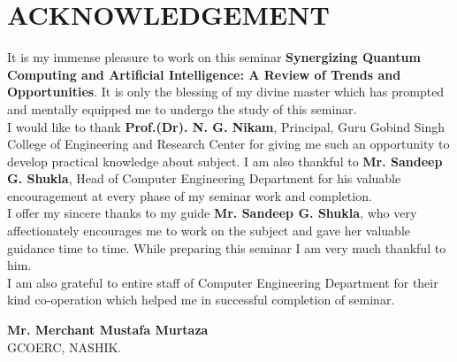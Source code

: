 
\chapter*{ACKNOWLEDGEMENT}
\hspace*{0.3in}It is my immense pleasure to work on this seminar {\bf Synergizing Quantum Computing and Artificial Intelligence: A Review of Trends and Opportunities}. It is only the blessing of my divine master which has prompted and mentally equipped me to undergo the study of this seminar. \\
\hspace*{0.3in}I would like to thank {\bf Prof.(Dr). N. G. Nikam}, Principal, Guru Gobind Singh College of Engineering and Research Center for giving me such an opportunity to develop practical knowledge about subject. I am also thankful to {\bf Mr. Sandeep G. Shukla}, Head of Computer Engineering Department for his valuable encouragement at every phase of my seminar work and completion. \\	
\hspace*{0.3in}I oﬀer my sincere thanks to my guide {\bf Mr. Sandeep G. Shukla}, who very affectionately encourages me to work on the subject and gave her valuable guidance time to time. While preparing this seminar I am very much thankful to him. \\
\hspace*{0.3in}I am also grateful to entire staﬀ of Computer Engineering Department for their kind co-operation which helped me in successful completion of seminar.\\

                                                              
\vspace{25mm} 
\begin{flushright}
{
\begin{minipage}{3.5in}
\textbf{Mr. Merchant Mustafa Murtaza}\\

 GCOERC, NASHIK.
\\
\end{minipage}} \hfill
\end{flushright}